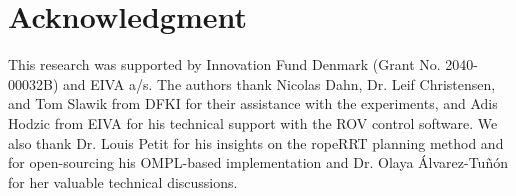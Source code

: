 \documentclass[letterpaper, 10 pt, conference]{ieeetran}  %
\begin{document}
\section*{Acknowledgment}
This research was supported by Innovation Fund Denmark (Grant No. 2040-00032B) and EIVA a/s. The authors thank Nicolas Dahn, Dr. Leif Christensen, and Tom Slawik from DFKI for their assistance with the experiments, and Adis Hodzic from EIVA for his technical support with the ROV control software. We also thank Dr. Louis Petit for his insights on the ropeRRT planning method and for open-sourcing his OMPL-based implementation and Dr. Olaya Álvarez-Tuñón for her valuable technical discussions.




%
\end{document}
